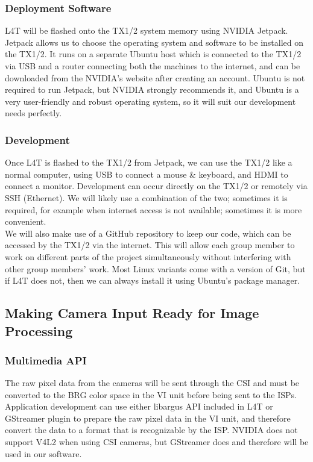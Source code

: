 \documentclass[letterpaper,10pt,serif,draftclsnofoot,onecolumn,compsoc,titlepage]{IEEEtran}
\begin{document}
\subsubsection{Deployment Software}

L4T will be flashed onto the TX1/2 system memory using NVIDIA Jetpack. Jetpack allows 
us to choose the operating system and software to be installed on the TX1/2. It runs on 
a separate Ubuntu host which is connected to the TX1/2 via USB and a router connecting 
both the machines to the internet, and can be downloaded from the NVIDIA's website 
after creating an account. Ubuntu is not required to run Jetpack, but NVIDIA strongly 
recommends it, and Ubuntu is a very user-friendly and robust operating system, so it 
will suit our development needs perfectly. \\

\subsubsection{Development}

Once L4T is flashed to the TX1/2 from Jetpack, we can use the TX1/2 like a normal 
computer, using USB to connect a mouse \& keyboard, and HDMI to connect a monitor. 
Development can occur directly on the TX1/2 or remotely via SSH (Ethernet). We will 
likely use a combination of the two; sometimes it is required, for example when 
internet access is not available; sometimes it is more convenient. \\

We will also make use of a GitHub repository to keep our code, which can be accessed 
by the TX1/2 via the internet. This will allow each group member to work on different 
parts of the project simultaneously without interfering with other group members' 
work. Most Linux variants come with a version of Git, but if L4T does not, then we 
can always install it using Ubuntu's package manager. \\

\subsection{Making Camera Input Ready for Image Processing}

\subsubsection{Multimedia API}

The raw pixel data from the cameras will be sent through the CSI and must be converted 
to the BRG color space in the VI unit before being sent to the ISPs. 
Application development can use either libargus API 
included in L4T or GStreamer plugin to prepare the raw pixel data in the VI unit, and 
therefore convert the data to a format that is recognizable by the ISP. NVIDIA does not 
support V4L2 when using CSI cameras, but GStreamer does and therefore will be used in 
our software.  \\
\end{document}
